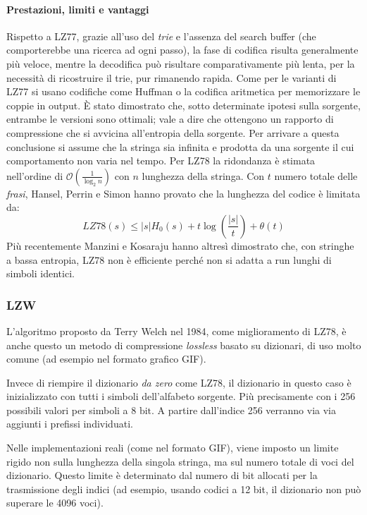\paragraph{Prestazioni, limiti e vantaggi}
Rispetto a LZ77, grazie all'uso del \textit{trie} e l'assenza del search buffer (che comporterebbe una ricerca ad ogni passo), la fase di codifica risulta generalmente più veloce, mentre la decodifica può risultare comparativamente più lenta, per la necessità di ricostruire il trie,  pur rimanendo rapida.
Come per le varianti di LZ77 si usano codifiche come Huffman o la codifica aritmetica per memorizzare le coppie in output.
È stato dimostrato che, sotto determinate ipotesi sulla sorgente, entrambe le versioni sono ottimali; vale a dire che ottengono un rapporto di compressione che si avvicina all'entropia della sorgente.
Per arrivare a questa conclusione si assume che la stringa sia infinita e prodotta da una sorgente il cui comportamento non varia nel tempo.
Per LZ78 la ridondanza è stimata nell'ordine di $\mathcal{O}\left(\frac{1}{\log_2 n}\right)$ con $n$ lunghezza della stringa.
Con $t$ numero totale delle \textit{frasi}, Hansel, Perrin e Simon hanno provato che la lunghezza del codice è limitata da:
\[ LZ78(s) \leq |s|H_0(s) + t\log\left(\frac{|s|}{t}\right) + \theta(t) \]
Più recentemente Manzini e Kosaraju hanno altresì dimostrato che, con stringhe a bassa entropia, LZ78 non è efficiente perché non si adatta a run lunghi di simboli identici.

\subsubsection{LZW}
L'algoritmo proposto da Terry Welch nel 1984, come miglioramento di LZ78, è anche questo un metodo di compressione \textit{lossless} basato su dizionari, di uso molto comune (ad esempio nel formato grafico GIF).

Invece di riempire il dizionario \textit{da zero} come LZ78, il dizionario in questo caso è inizializzato con tutti i simboli dell'alfabeto sorgente. Più precisamente con i 256 possibili valori per simboli a $8\text{ bit}$. A partire dall'indice 256 verranno via via aggiunti i prefissi individuati.

Nelle implementazioni reali (come nel formato GIF), viene imposto un limite rigido non sulla lunghezza della singola stringa, ma sul numero totale di voci del dizionario. Questo limite è determinato dal numero di bit allocati per la trasmissione degli indici (ad esempio, usando codici a 12 bit, il dizionario non può superare le 4096 voci).



